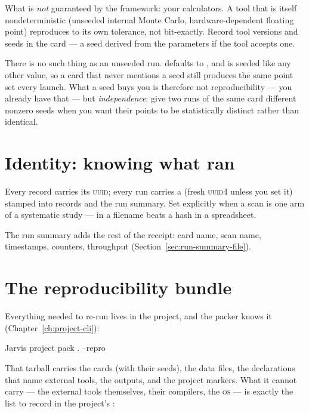 What is \emph{not} guaranteed by the framework: your calculators. A tool that is
itself nondeterministic (unseeded internal Monte Carlo, hardware-dependent floating
point) reproduces to its own tolerance, not bit-exactly. Record tool versions and
seeds in the card ---  a seed derived from the parameters if the tool
accepts one.

\begin{jnote}
There is no such thing as an unseeded run.  defaults to ,
and  is seeded like any other value, so a card that never mentions a seed still
produces the same point set every launch. What a seed buys you is therefore not
reproducibility --- you already have that --- but \emph{independence}: give two runs of
the same card different nonzero seeds when you want their points to be statistically
distinct rather than identical.
\end{jnote}

\section{Identity: knowing what ran}
\label{sec:identity}

Every record carries its \textsc{uuid}; every run carries a  (fresh
\textsc{uuid4} unless you set it) stamped into records and the run summary. Set
 explicitly when a scan is one arm of a systematic study ---
 in a filename beats a hash in a spreadsheet.

The run summary adds the rest of the receipt: card name, scan name, timestamps,
counters, throughput (Section~\ref{sec:run-summary-file}).

\section{The reproducibility bundle}
\label{sec:repro-bundle}

Everything needed to re-run lives in the project, and the packer knows it
(Chapter~\ref{ch:project-cli}):

\begin{terminal}
\begin{jcmd}
Jarvis project pack . --repro
\end{jcmd}
\end{terminal}

That tarball carries the cards (with their seeds), the data files, the
 declarations that name external tools, the outputs, and the project
markers. What it cannot carry --- the external tools themselves, their compilers, the
\textsc{os} --- is exactly the list to record in the project's :

